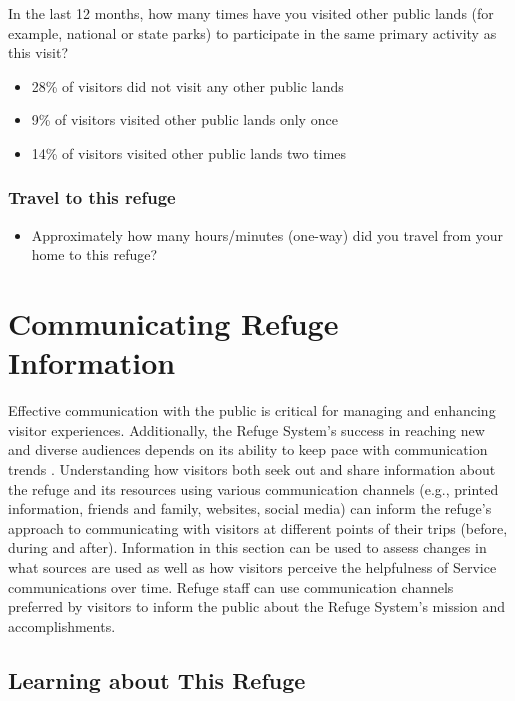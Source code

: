 \documentclass[]{book}
\providecommand{\tightlist}{%
  \setlength{\itemsep}{0pt}\setlength{\parskip}{0pt}}
\let\BeginKnitrBlock\begin \let\EndKnitrBlock\end
\begin{document}
In the last 12 months, how many times have you visited other public
lands (for example, national or state parks) to participate in the same
primary activity as this visit?

\begin{itemize}
\tightlist
\item
  28\% of visitors did not visit any other public lands
\item
  9\% of visitors visited other public lands only once
\item
  14\% of visitors visited other public lands two times
\end{itemize}

\subsection*{Travel to this refuge}\label{travel-to-this-refuge}

\begin{itemize}
\tightlist
\item
  Approximately how many hours/minutes (one-way) did you travel from
  your home to this refuge?
\end{itemize}

\chapter{Communicating Refuge Information}\label{info}

\BeginKnitrBlock{heading4}
Effective communication with the public is critical for managing and
enhancing visitor experiences. Additionally, the Refuge System's success
in reaching new and diverse audiences depends on its ability to keep
pace with communication trends \citep{USFWS2016a}. Understanding how
visitors both seek out and share information about the refuge and its
resources using various communication channels (e.g., printed
information, friends and family, websites, social media) can inform the
refuge's approach to communicating with visitors at different points of
their trips (before, during and after). Information in this section can
be used to assess changes in what sources are used as well as how
visitors perceive the helpfulness of Service communications over time.
Refuge staff can use communication channels preferred by visitors to
inform the public about the Refuge System's mission and accomplishments.
\EndKnitrBlock{heading4}

\section*{Learning about This Refuge}\label{learning-about-this-refuge}
\end{document}
